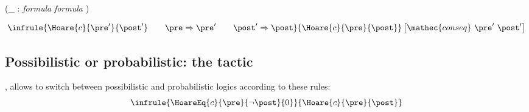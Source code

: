 \Syntax {} (\_ : \textit{formula} \rawec{==>} \textit{formula} )

\begin{displaymath}
\infrule{
  \Hoare{c}{\pre'}{\post'} \qquad \pre\Rightarrow\pre' \qquad  \post'\Rightarrow\post
}{
  \Hoare{c}{\pre}{\post}
}\left[\mathec{conseq}~ \pre'~ \post' \right]
\end{displaymath}



\subsection{Possibilistic or probabilistic: the  tactic}

\Syntax {}, 
allows to switch between possibilistic and probabilistic logics
according to these rules:
\begin{displaymath}
\infrule{
  \HoareEq{c}{\pre}{\neg\post}{0}
}{
  \Hoare{c}{\pre}{\post}
}
\end{displaymath}
